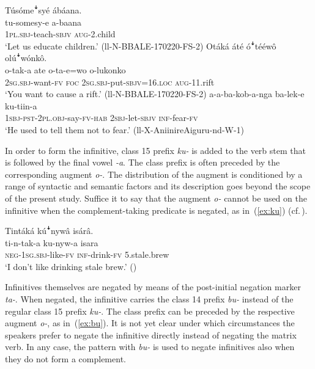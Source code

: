 \documentclass[output=paper,colorlinks,citecolor=brown,draftmode]{langscibook}
\begin{document}
\ea \label{ex:subjunctivecompl}
\begin{xlist}
\ex \label{ex:subjunctiveindependent}
	\glll   Túsómeꜜsyé ábáana.\\
	        tu-somesy-e a-baana\\
	    	1\textsc{pl.sbj}-teach-\textsc{sbjv} \textsc{aug}-2.child\\
	\glt ‘Let us educate children.’ 	(ll-N-BBALE-170220-FS-2)
\ex \label{ex:subjunctivedependent}
	\glll Otáká áté óꜜtééwô olúꜜwónkô.\\
	        o-tak-a ate o-ta-e=wo o-lukonko\\ 
		    \textsc{2sg.sbj}-want-\textsc{fv} \textsc{foc} \textsc{2sg.sbj}-put-\textsc{sbjv}=16.\textsc{loc} \textsc{aug}-11.rift\\
	\glt ‘You want to cause a rift.' (ll-N-BBALE-170220-FS-2)
\ex \label{ex:leka}
	\gll        a-a-ba-kob-a-nga             ba-lek-e        ku-tiin-a\\ 
		    \textsc{1sbj}-\textsc{pst}-\textsc{2pl.obj}-say-\textsc{fv}-\textsc{hab} \textsc{2sbj}-let-\textsc{sbjv} \textsc{inf}-fear-\textsc{fv}\\
	\glt ‘He used to tell them not to fear.' (ll-X-AniinireAiguru-nd-W-1)
\end{xlist}
\z

In order to form the infinitive, class 15 prefix \textit{ku-} is added to the verb stem that is followed by the final vowel \textit{-a}. 
The class prefix is often preceded by the corresponding augment \textit{o-}. 
The distribution of the augment is conditioned by a range of syntactic and semantic factors and its description goes beyond the scope of the present study. 
Suffice it to say that the augment \textit{o-} cannot be used on the infinitive when the complement-taking predicate is negated, as in~(\ref{ex:ku}) (cf.\,\citealt{SorensenWitzlack-Makarevich2020}).

\ea \label{ex:ku} 
	\glll   Tintáká kúꜜnywâ isárâ.\\
	        ti-n-tak-a ku-nyw-a isara\\
	    	\textsc{neg}-1\textsc{sg.sbj}-like-\textsc{fv} \textsc{inf}-drink-\textsc{fv} 5.stale.brew\\
    \glt ‘I don’t like drinking stale brew.’ (\citealt[296]{NamyaloEtAl2021})
\z

Infinitives themselves are negated by means of the post-initial negation marker \textit{ta-}. 
When negated, the infinitive carries the class 14 prefix \textit{bu-} instead of the regular class 15 prefix \textit{ku-}. 
The class prefix can be preceded by the respective augment \textit{o-}, as in~(\ref{ex:bu}). 
It is not yet clear under which circumstances the speakers prefer to negate the infinitive directly instead of negating the matrix verb. 
In any case, the pattern with  \textit{bu-} is used to negate infinitives also when they do not form a complement.
\end{document}
